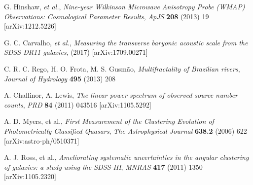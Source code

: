 \documentclass[a4paper,11pt]{article}
\begin{document}
\begin{thebibliography}{99}
G. Hinshaw, {\it et al.}, 
\emph{Nine-year Wilkinson Microwave Anisotropy Probe (WMAP) Observations: Cosmological 
Parameter Results}, 
\emph{ApJS}
{\bf 208} 
(2013)
19
[arXiv:1212.5226]

G. C. Carvalho, {\it et al.}, 
\emph{Measuring the transverse baryonic acoustic scale from the SDSS DR11 galaxies}, 
(2017)
[arXiv:1709.00271]

C. R. C. Rego, H. O. Frota, M. S. Gusm\~ao, 
\emph{Multifractality of Brazilian rivers}, 
\emph{Journal of Hydrology} 
{\bf 495} 
(2013)
208 

A. Challinor, A. Lewis, 
\emph{The linear power spectrum of observed source number counts}, 
\emph{PRD} 
{\bf 84} 
(2011) 
043516 
[arXiv:1105.5292]


A. D. Myers, et al., 
\emph{First Measurement of the Clustering Evolution of Photometrically Classified Quasars}, 
\emph{The Astrophysical Journal} 
{\bf 638.2}
(2006)
622%
[arXiv:astro-ph/0510371]

A. J. Ross, et al., 
\emph{Ameliorating systematic uncertainties in the angular clustering of galaxies: a study using 
the SDSS-III},
\emph{MNRAS} 
{\bf 417} 
(2011)
1350%
[arXiv:1105.2320]

%
%
%
%
%
%
%
%
%
%
%

\end{thebibliography}
\end{document}

